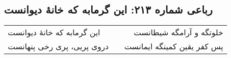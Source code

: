 \begin{center}
\section*{رباعی شماره ۲۱۳: این گرمابه که خانهٔ دیوانست}
\label{sec:0213}
\begin{longtable}{l p{0.5cm} r}
این گرمابه که خانهٔ دیوانست
&&
خلوتگه و آرامگه شیطانست
\\
دروی پریی، پری رخی پنهانست
&&
پس کفر یقین کمینگه ایمانست
\\
\end{longtable}
\end{center}
